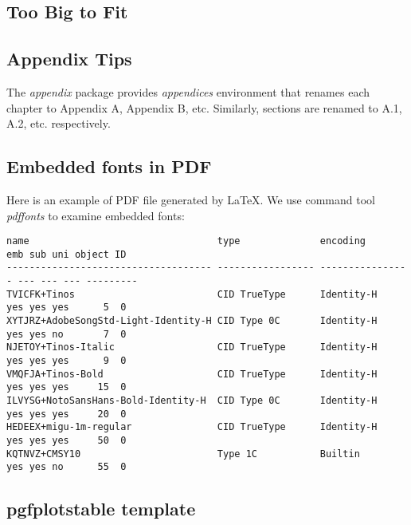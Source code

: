 \begin{appendices}

\chapter{Too Big to Fit}
\label{cha:too-big-fit}

\section{Appendix Tips}
\label{cha:appendix-tips}

The \textit{appendix} package provides \textit{appendices}
environment that renames each chapter to Appendix A, Appendix B,
etc. Similarly, sections are renamed to A.1, A.2,
etc. respectively.

\section{Embedded fonts in PDF}
\label{sec:pdffonts}

Here is an example of PDF file generated by \LaTeX{}. We use
command tool \textit{pdffonts} to examine embedded fonts:

\begin{lstlisting}[language={},caption={\LaTeX{} 内嵌字体},label={pdffonts},frame={tb},basicstyle=\tiny\ttfamily,linewidth=.88\textwidth]
name                                 type              encoding         emb sub uni object ID
------------------------------------ ----------------- ---------------- --- --- --- ---------
TVICFK+Tinos                         CID TrueType      Identity-H       yes yes yes      5  0
XYTJRZ+AdobeSongStd-Light-Identity-H CID Type 0C       Identity-H       yes yes no       7  0
NJETOY+Tinos-Italic                  CID TrueType      Identity-H       yes yes yes      9  0
VMQFJA+Tinos-Bold                    CID TrueType      Identity-H       yes yes yes     15  0
ILVYSG+NotoSansHans-Bold-Identity-H  CID Type 0C       Identity-H       yes yes yes     20  0
HEDEEX+migu-1m-regular               CID TrueType      Identity-H       yes yes yes     50  0
KQTNVZ+CMSY10                        Type 1C           Builtin          yes yes no      55  0
\end{lstlisting}  

\section{pgfplotstable template}
\label{sec:pgfplotstable-template}


\end{appendices}
